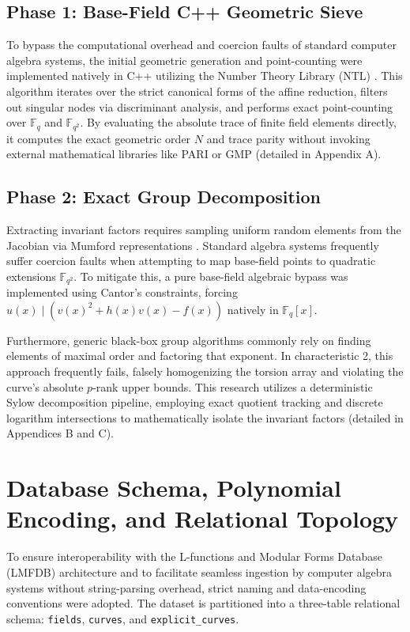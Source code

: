 \documentclass[letterpaper, 11pt]{article}
\begin{document}
	\subsection{Phase 1: Base-Field C++ Geometric Sieve}
	To bypass the computational overhead and coercion faults of standard computer algebra systems, the initial geometric generation and point-counting were implemented natively in C++ utilizing the Number Theory Library (NTL) \cite{ShoupNTL}. This algorithm iterates over the strict canonical forms of the affine reduction, filters out singular nodes via discriminant analysis, and performs exact point-counting over $\mathbb{F}_q$ and $\mathbb{F}_{q^2}$. By evaluating the absolute trace of finite field elements directly, it computes the exact geometric order $N$ and trace parity without invoking external mathematical libraries like PARI or GMP (detailed in Appendix A).
	
	\subsection{Phase 2: Exact Group Decomposition}
	Extracting invariant factors requires sampling uniform random elements from the Jacobian via Mumford representations \cite{Cantor1987}. Standard algebra systems frequently suffer coercion faults when attempting to map base-field points to quadratic extensions $\mathbb{F}_{q^2}$. To mitigate this, a pure base-field algebraic bypass was implemented using Cantor's constraints, forcing $u(x) \mid \left( v(x)^2 + h(x)v(x) - f(x) \right)$ natively in $\mathbb{F}_q[x]$.
	
	Furthermore, generic black-box group algorithms commonly rely on finding elements of maximal order and factoring that exponent. In characteristic 2, this approach frequently fails, falsely homogenizing the torsion array and violating the curve's absolute $p$-rank upper bounds. This research utilizes a deterministic Sylow decomposition pipeline, employing exact quotient tracking and discrete logarithm intersections to mathematically isolate the invariant factors (detailed in Appendices B and C).
	
	\section{Database Schema, Polynomial Encoding, and Relational Topology}
	To ensure interoperability with the L-functions and Modular Forms Database (LMFDB) architecture and to facilitate seamless ingestion by computer algebra systems without string-parsing overhead, strict naming and data-encoding conventions were adopted. The dataset is partitioned into a three-table relational schema: \texttt{fields}, \texttt{curves}, and \texttt{explicit\_curves}.
	
\end{document}
